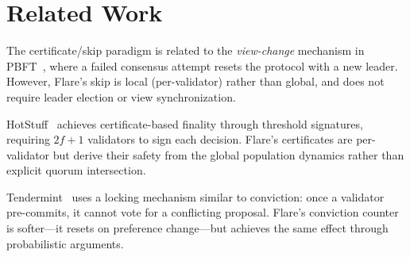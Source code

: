 \section{Related Work}

\label{sec:related}

The certificate/skip paradigm is related to the \emph{view-change} mechanism in
PBFT~\cite{castro1999practical}, where a failed consensus attempt resets the protocol
with a new leader. However, Flare's skip is local (per-validator) rather than global,
and does not require leader election or view synchronization.

HotStuff~\cite{yin2019hotstuff} achieves certificate-based finality through threshold
signatures, requiring $2f+1$ validators to sign each decision. Flare's certificates are
per-validator but derive their safety from the global population dynamics rather than
explicit quorum intersection.

Tendermint~\cite{buchman2016tendermint} uses a locking mechanism similar to conviction:
once a validator pre-commits, it cannot vote for a conflicting proposal. Flare's conviction
counter is softer---it resets on preference change---but achieves the same effect through
probabilistic arguments.

